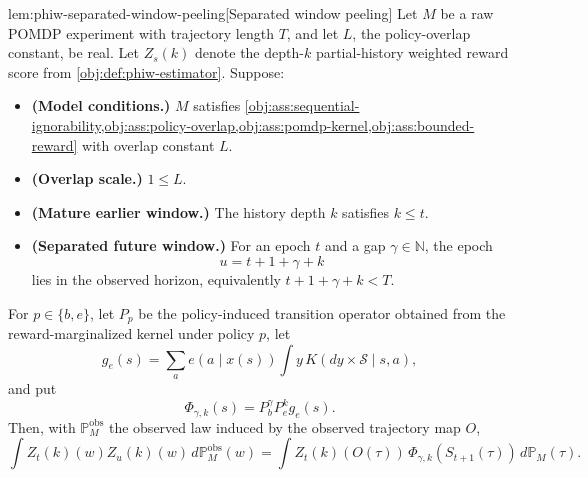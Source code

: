 \documentclass[11pt]{article}
\begin{document}
\begin{lemmav}{lem:phiw-separated-window-peeling}[Separated window peeling]
Let \(M\) be a raw POMDP experiment with trajectory length \(T\), and let \(L\), the policy-overlap constant, be real. Let \(Z_s(k)\) denote the depth-\(k\) partial-history weighted reward score from \cref{obj:def:phiw-estimator}. Suppose:
\begin{itemize}
\item \textbf{(Model conditions.)} \(M\) satisfies \cref{obj:ass:sequential-ignorability,obj:ass:policy-overlap,obj:ass:pomdp-kernel,obj:ass:bounded-reward} with overlap constant \(L\).
\item \textbf{(Overlap scale.)} \(1\le L\).
\item \textbf{(Mature earlier window.)} The history depth \(k\) satisfies \(k\le t\).
\item \textbf{(Separated future window.)} For an epoch \(t\) and a gap \(\gamma\in\mathbb N\), the epoch
\[
u=t+1+\gamma+k
\]
lies in the observed horizon, equivalently \(t+1+\gamma+k<T\).
\end{itemize}
For \(p\in\{b,e\}\), let \(P_p\) be the policy-induced transition operator obtained from the reward-marginalized kernel under policy \(p\), let
\[
g_e(s)=\sum_a e(a\mid x(s))\int y\,K(dy\times\mathcal S\mid s,a),
\]
and put
\[
\Phi_{\gamma,k}(s)=P_b^\gamma P_e^k g_e(s).
\]
Then, with \(\mathbb P_M^{\mathrm{obs}}\) the observed law induced by the observed trajectory map \(O\),
\[
\int Z_t(k)(w)Z_u(k)(w)\,d\mathbb P_M^{\mathrm{obs}}(w)
=
\int Z_t(k)(O(\tau))\,\Phi_{\gamma,k}(S_{t+1}(\tau))\,d\mathbb P_M(\tau).
\]
\end{lemmav}
\end{document}
